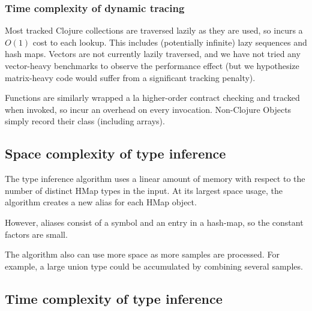%

\subsubsection{Time complexity of dynamic tracing}

Most tracked Clojure collections are traversed lazily as they are used,
so incurs a $O(1)$ cost to each lookup.
This includes (potentially infinite) lazy sequences and hash maps.
Vectors are not currently lazily traversed, and we have not tried any vector-heavy
benchmarks to observe the performance effect (but we hypothesize matrix-heavy
code would suffer from a significant tracking penalty).

Functions are similarly wrapped a la higher-order contract checking and tracked when invoked,
so incur an overhead on every invocation.
Non-Clojure Objects simply record their class (including arrays).

\pagebreak

\subsection{Space complexity of type inference}

The type inference algorithm uses a linear amount of memory with respect
to the number of distinct HMap types in the input.
At its largest space usage, the algorithm creates a new alias for each HMap object.

However, aliases consist of a symbol and an entry in a hash-map, so the constant
factors are small.

The algorithm also can use more space as more samples are processed. For example,
a large union type could be accumulated by combining several samples.

\subsection{Time complexity of type inference}

